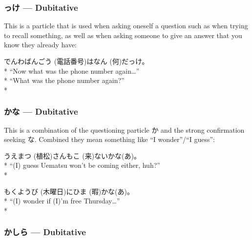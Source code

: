 \documentclass[11pt, b5paper, twoside, openright, onecolumn]{book}
\makeatletter
\newcommand*{\rubystack}[2]{{\relscale{0.5}%
  \begin{tabular}[b]{@{}c@{}}%
    {#1}\\%
   {\textscale{2}{#2}}%
  \end{tabular}}%
}
\DeclareRobustCommand*{\ruby}[2]{%
  \mbox{%
    \setlength{\parskip}{0ex}%
    \BeginAccSupp{method=pdfstringdef,ActualText={#1}}%
      \rubystack{\phantom{#2}}{#1}%
      \llap{%
        \rubystack{#2}{\phantom{#1}}%
      }%
    \EndAccSupp{}%
  }%
}
\renewcommand*{\ruby}[2]{#2 (#1)}%
\newenvironment{exampleblock}{
\setlength{\parindent}{0.6in}
\begin{minipage}[t]{\dimexpr\textwidth-\parindent}}
{\end{minipage}}
\makeatother
\begin{document}
\subsubsection{っけ — Dubitative}


This is a particle that is used when asking oneself a question such as when trying to recall something‚ as well as when asking someone to give an answer that you know they already have:

\vspace{0.4cm}
\begin{exampleblock}
\ruby{電話番号}{でんわばんごう}は\ruby{何}{なん}だっけ。 \\* 
“Now what was the phone number again…” \\* 
“What was the phone number again?” \\* 
\end{exampleblock}
\subsubsection{かな — Dubitative}


This is a combination of the questioning particle か and the strong confirmation seeking な. Combined they mean something like “I wonder”/“I guess”:

\vspace{0.4cm}
\begin{exampleblock}
\ruby{植松}{うえまつ}さんも\ruby{来}{こ}ないかな(あ)。 \\* 
“(I) guess Uematsu won’t be coming either‚ huh?” \\* 
\end{exampleblock}
\vspace{0.2cm}

\begin{exampleblock}
\ruby{木曜日}{もくようび}に\ruby{暇}{ひま}かな(あ)。 \\* 
“(I) wonder if (I)’m free Thursday…” \\* 
\end{exampleblock}
\subsubsection{かしら — Dubitative}
\end{document}
